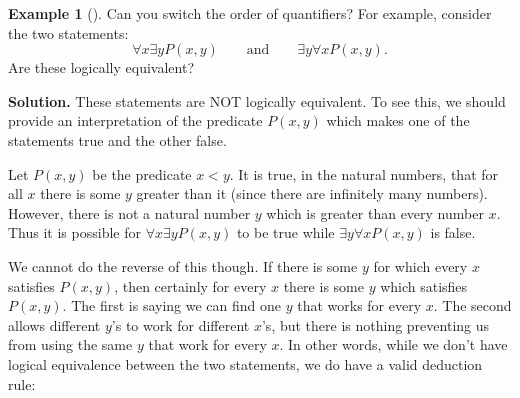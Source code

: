 \documentclass[10pt,]{book}
\theoremstyle{plain}
\theoremstyle{definition}
\theoremstyle{definition}
\newtheorem{example}[theorem]{Example}
\theoremstyle{definition}
\numberwithin{equation}{chapter}
\newcommand{\hrulethin}  {\noalign{\hrule height 0.04em}}
\newlength{\panelmax}
\newcommand{\lt}{<}
\begin{document}
\begin{example}[]\label{example-43}
\hypertarget{p-2343}{}%
Can you switch the order of quantifiers? For example, consider the two statements:%
\begin{equation*}
\forall x \exists y P(x,y) \qquad \mathrm{ and } \qquad \exists y \forall x P(x,y).
\end{equation*}
Are these logically equivalent?%
\par\smallskip%
\noindent\textbf{Solution.}\hypertarget{solution-281}{}\quad%
\hypertarget{p-2344}{}%
These statements are NOT logically equivalent. To see this, we should provide an interpretation of the predicate \(P(x,y)\) which makes one of the statements true and the other false.%
\par
\hypertarget{p-2345}{}%
Let \(P(x,y)\) be the predicate \(x \lt  y\). It is true, in the natural numbers, that for all \(x\) there is some \(y\) greater than it (since there are infinitely many numbers). However, there is not a natural number \(y\) which is greater than every number \(x\).  Thus it is possible for \(\forall x \exists y P(x,y)\) to be true while \(\exists y \forall x P(x,y)\) is false.%
\par
\hypertarget{p-2346}{}%
We cannot do the reverse of this though. If there is some \(y\) for which every \(x\) satisfies \(P(x,y)\), then certainly for every \(x\) there is some \(y\) which satisfies \(P(x,y)\). The first is saying we can find one \(y\) that works for every \(x\). The second allows different \(y\)'s to work for different \(x\)'s, but there is nothing preventing us from using the same \(y\) that work for every \(x\).  In other words, while we don't have logical equivalence between the two statements, we do have a valid deduction rule:%
{%
\setlength{\panelmax}{0pt}
\ifdefined\panelboxAtabular\else\newsavebox{\panelboxAtabular}\fi%
\savebox{\panelboxAtabular}{%
\raisebox{\depth}{\parbox{1\linewidth}{\centering\begin{tabular}{cc}
&\(\exists y \forall x P(x,y)\)\tabularnewline\hrulethin
\(\therefore\)&\(\forall x \exists y P(x,y)\)
\end{tabular}
}}}
\ifdefined\phAtabular\else\newlength{\phAtabular}\fi%
\setlength{\phAtabular}{\ht\panelboxAtabular+\dp\panelboxAtabular}
\settototalheight{\phAtabular}{\usebox{\panelboxAtabular}}
\setlength{\panelmax}{\maxof{\panelmax}{\phAtabular}}
\leavevmode%
}
\end{example}
\end{document}
